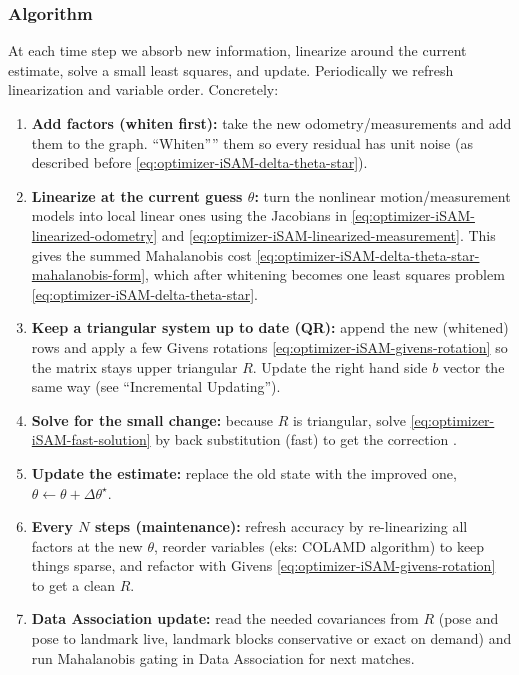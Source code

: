 \subsubsection{Algorithm}
At each time step we absorb new information, linearize around the current estimate, solve a small least squares, and update. Periodically we refresh linearization and variable order. Concretely:
\begin{enumerate}
    \item \textbf{Add factors (whiten first):} take the new odometry/measurements and add them to the graph. ``Whiten”'' them so every residual has unit noise (as described before \eqref{eq:optimizer-iSAM-delta-theta-star}).

    \item \textbf{Linearize at the current guess \(\theta\):} turn the nonlinear motion/measurement models into local linear ones using the Jacobians in
    \eqref{eq:optimizer-iSAM-linearized-odometry} and \eqref{eq:optimizer-iSAM-linearized-measurement}. This gives the summed Mahalanobis cost \eqref{eq:optimizer-iSAM-delta-theta-star-mahalanobis-form}, which after whitening becomes one least squares problem \eqref{eq:optimizer-iSAM-delta-theta-star}.

    \item \textbf{Keep a triangular system up to date (QR):} append the new (whitened) rows and apply a few Givens rotations \eqref{eq:optimizer-iSAM-givens-rotation} so the matrix stays upper triangular $R$. Update the right hand side $b$ vector the same way (see ``Incremental Updating'').

    \item \textbf{Solve for the small change:} because $R$ is triangular, solve
    \eqref{eq:optimizer-iSAM-fast-solution} by back substitution (fast) to get the correction .

    \item \textbf{Update the estimate:} replace the old state with the improved one,
    $\theta \leftarrow \theta + \Delta\theta^\star$.

    \item \textbf{Every \(N\) steps (maintenance):} refresh accuracy by re-linearizing all factors at the new $\theta$, reorder variables (eks: COLAMD algorithm) to keep things sparse, and refactor with Givens \eqref{eq:optimizer-iSAM-givens-rotation} to get a clean $R$.

    \item \textbf{Data Association update:} read the needed covariances from $R$ (pose and pose to landmark live, landmark blocks conservative or exact on demand) and run Mahalanobis gating in Data Association for next matches.
\end{enumerate}



